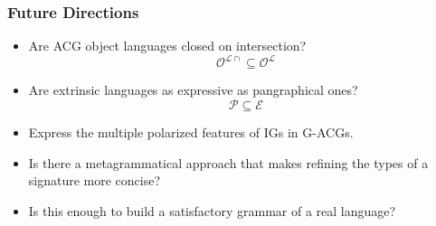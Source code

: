 \documentclass{beamer}
\begin{document}
\begin{frame}
  \frametitle{Future Directions}

  \begin{itemize}
  \item Are ACG object languages closed on
    intersection? $$\mathcal{O}^{\mathcal{L}{\cap}} \subseteq \mathcal{O}^{\mathcal{L}}$$
  \item Are extrinsic languages as expressive as pangraphical
    ones? $$\mathcal{P} \subseteq \mathcal{E}$$
  \item Express the multiple polarized features of IGs in G-ACGs.
  \vfill
  \item Is there a metagrammatical approach that makes refining the types of a
    signature more concise?
  \vfill
  \item Is this enough to build a satisfactory grammar of a real language?
  \end{itemize}
\end{frame}
\end{document}
